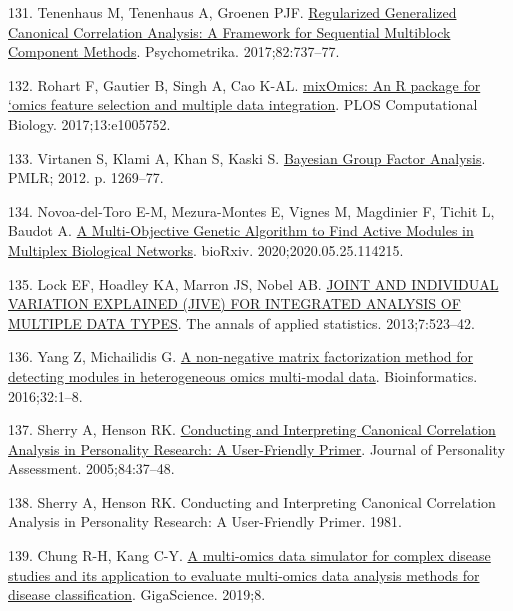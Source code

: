 \documentclass[
  12pt,
  a4paper,
  twoside,
  openright]{book}
\newlength{\cslhangindent}
\newlength{\cslentryspacingunit} %
\newenvironment{CSLReferences}[2] %
 {%
  \setlength{\parindent}{0pt}
  \ifodd #1
  \let\oldpar\par
  \def\par{\hangindent=\cslhangindent\oldpar}
  \fi
  \setlength{\parskip}{#2\cslentryspacingunit}
 }%
 {}
\begin{document}
\begin{CSLReferences}{0}{0}
\leavevmode{}%
131. Tenenhaus M, Tenenhaus A, Groenen PJF. \href{https://doi.org/10.1007/s11336-017-9573-x}{Regularized Generalized Canonical Correlation Analysis: A Framework for Sequential Multiblock Component Methods}. Psychometrika. 2017;82:737--77.

\leavevmode{}%
132. Rohart F, Gautier B, Singh A, Cao K-AL. \href{https://doi.org/10.1371/journal.pcbi.1005752}{mixOmics: An R package for {`}omics feature selection and multiple data integration}. PLOS Computational Biology. 2017;13:e1005752.

\leavevmode{}%
133. Virtanen S, Klami A, Khan S, Kaski S. \href{https://proceedings.mlr.press/v22/virtanen12.html}{Bayesian Group Factor Analysis}. PMLR; 2012. p. 1269--77.

\leavevmode{}%
134. Novoa-del-Toro E-M, Mezura-Montes E, Vignes M, Magdinier F, Tichit L, Baudot A. \href{https://doi.org/10.1101/2020.05.25.114215}{A Multi-Objective Genetic Algorithm to Find Active Modules in Multiplex Biological Networks}. bioRxiv. 2020;2020.05.25.114215.

\leavevmode{}%
135. Lock EF, Hoadley KA, Marron JS, Nobel AB. \href{https://doi.org/10.1214/12-AOAS597}{JOINT AND INDIVIDUAL VARIATION EXPLAINED (JIVE) FOR INTEGRATED ANALYSIS OF MULTIPLE DATA TYPES}. The annals of applied statistics. 2013;7:523--42.

\leavevmode{}%
136. Yang Z, Michailidis G. \href{https://doi.org/10.1093/bioinformatics/btv544}{A non-negative matrix factorization method for detecting modules in heterogeneous omics multi-modal data}. Bioinformatics. 2016;32:1--8.

\leavevmode{}%
137. Sherry A, Henson RK. \href{https://doi.org/10.1207/s15327752jpa8401_09}{Conducting and Interpreting Canonical Correlation Analysis in Personality Research: A User-Friendly Primer}. Journal of Personality Assessment. 2005;84:37--48.

\leavevmode{}%
138. Sherry A, Henson RK. Conducting and {Interpreting Canonical Correlation Analysis} in {Personality Research}: {A User}-{Friendly Primer}. 1981.

\leavevmode{}%
139. Chung R-H, Kang C-Y. \href{https://doi.org/10.1093/gigascience/giz045}{A multi-omics data simulator for complex disease studies and its application to evaluate multi-omics data analysis methods for disease classification}. GigaScience. 2019;8.


\end{CSLReferences}
\end{document}
